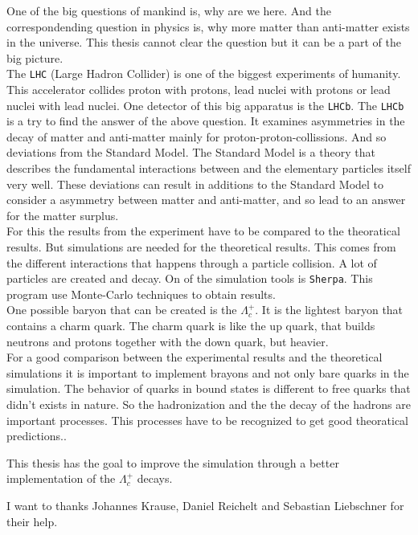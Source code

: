 One of the big questions of mankind is, why are we here. And the correspondending 
question in physics is, why more matter than anti-matter exists in the universe. 
This thesis cannot clear the question but it can be a part of the big picture.\\
The \texttt{LHC} (Large Hadron Collider) is one of the biggest experiments of 
humanity. This accelerator collides proton with protons, lead nuclei with 
protons or lead nuclei with lead nuclei. One detector of this big apparatus 
is the \texttt{LHCb}. The \texttt{LHCb} is a try to find the answer of the 
above question. It examines asymmetries in the decay of matter and 
anti-matter mainly for proton-proton-collissions. And so deviations 
from the Standard Model. The Standard Model is a theory that describes the 
fundamental interactions between and the elementary particles itself very 
well. These deviations can result in additions to the Standard Model to consider 
a asymmetry between matter and anti-matter, and so lead to an answer for the 
matter surplus.\\
For this the results from the experiment have to be compared to the 
theoratical results. But simulations are needed for the theoretical results. 
This comes from the different interactions that happens through a particle 
collision. A lot of particles are created and decay. On of the simulation 
tools is \texttt{Sherpa}{\cite{sherpa}}. This program use Monte-Carlo techniques 
to obtain results.\\
One possible baryon that can be created is the \(\Lambda_c^+\). It is the 
lightest baryon that contains a charm quark. The charm quark is like the 
up quark, that builds neutrons and protons together with the down quark, but 
heavier.\\
For a good comparison between the experimental results and the theoretical 
simulations it is important to implement brayons and not only bare quarks in the 
simulation. The behavior of quarks in bound states is different to free quarks 
that didn't exists in nature. So the hadronization and the the decay of the 
hadrons are important processes. This processes have to be recognized to 
get good theoratical predictions..
\par
This thesis has the goal to improve the simulation through a better implementation 
of the \(\Lambda_c^+\) decays.
\par
I want to thanks Johannes Krause, Daniel Reichelt and Sebastian Liebschner for 
their help.
